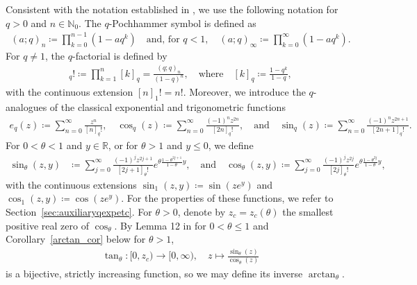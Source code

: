 \documentclass[12pt]{article}
\newcommand{\N}{\mathbb{N}} %
\newcommand{\R}{\mathbb{R}} %
\newcommand{\1}{\mathds{1}}
\theoremstyle{definition}
\theoremstyle{plain}
\theoremstyle{remark}
\begin{document}
Consistent with the notation established in \cite{AR}, we use the following notation for $q>0$ and $n\in\N_0$. The $q$-Pochhammer symbol is defined as
\begin{align*}
    (a;q)_n\coloneqq\prod_{k=0}^{n-1} (1-a q^k)\quad\text{and, for }q<1, \quad(a;q)_\infty\coloneqq\prod_{k=0}^{\infty} (1-a q^k).
\end{align*}
For $q\neq 1$, the $q$-factorial is defined by
\begin{align*}
    [n]_q! \coloneqq \prod_{k=1}^{n}[k]_q   = \frac{(q;q)_n}{(1-q)^n},\quad\text{where}\quad [k]_q\coloneqq\frac{1-q^k}{1-q},
\end{align*}
with the continuous extension $[n]_1!=n!$. Moreover, we introduce the $q$-analogues of the classical exponential and trigonometric functions 
\begin{align*}
e_q(z)\coloneqq \sum_{n=0}^\infty \frac{z^{n}}{[n]_q!},\quad
    \cos_q(z) \coloneqq \sum_{n=0}^\infty \frac{(-1)^nz^{2n}}{[2n]_q!},
    \quad\text{and}\quad
    \sin_q(z) \coloneqq \sum_{n=0}^\infty \frac{(-1)^nz^{2n+1}}{[2n+1]_q!}.
\end{align*}
For $0<\theta<1$ and $y\in\R$, or for $\theta>1$ and $y\le 0$, we define
\begin{align*}
    \sin_\theta(z,y)&\coloneqq \sum_{j=0}^\infty\frac{(-1)^{j}z^{2j+1}}{[2j+1]_{\theta}!}e^{\theta\frac{1-\theta^{2j+1}}{1-\theta} y}, \quad\text{and}\quad\cos_\theta(z,y)\coloneqq\sum_{j=0}^\infty\frac{(-1)^{j}z^{2j}}{[2j]_{\theta}!}e^{\theta\frac{1-\theta^{2j}}{1-\theta} y},
\end{align*}
with the continuous extensions
$\sin_1(z,y)\coloneqq \sin(ze^y)$ and $\cos_1(z,y)\coloneqq\cos(ze^y)$. For the properties of these functions, we refer to Section~\ref{sec:auxiliaryqexpetc}.
 For $\theta>0$, denote by $z_c=z_c(\theta)$ the smallest positive real zero of $\cos_{\theta}$.  By Lemma 12 in \cite{AR} for $0<\theta\le 1$ and Corollary~\ref{arctan_cor} below for $\theta>1$, 
\begin{align*}
    \tan_{\theta}:[0,z_c)\to[0,\infty),\quad z\mapsto\frac{\sin_\theta(z)}{\cos_\theta(z)}
\end{align*}
is a bijective, strictly increasing function, so we may define its inverse $\arctan_{\theta}$. 
\end{document}

